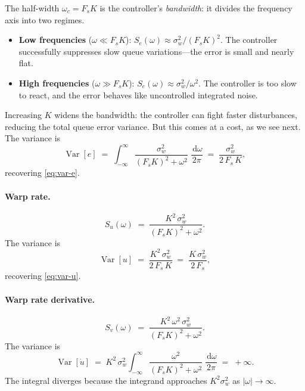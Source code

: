 \documentclass[11pt, a4paper]{article}
\theoremstyle{definition}
\theoremstyle{plain}
\theoremstyle{remark}
\newcommand{\Var}{\operatorname{Var}}
\newcommand{\dd}{\,\mathrm{d}}                   %
\begin{document}
The half-width $\omega_c = F_s K$ is the controller's
\emph{bandwidth}: it divides the frequency axis into two regimes.
\begin{itemize}
  \item \textbf{Low frequencies} ($\omega \ll F_s K$):
    $S_e(\omega) \approx \sigma_w^2 / (F_s K)^2$.  The controller
    successfully suppresses slow queue variations---the error is
    small and nearly flat.
  \item \textbf{High frequencies} ($\omega \gg F_s K$):
    $S_e(\omega) \approx \sigma_w^2 / \omega^2$.  The controller
    is too slow to react, and the error behaves like uncontrolled
    integrated noise.
\end{itemize}
Increasing $K$ widens the bandwidth: the controller can fight
faster disturbances, reducing the total queue error variance.
But this comes at a cost, as we see next.
The variance is
\begin{equation}\label{eq:var-e-psd}
  \Var[e] \;=\; \int_{-\infty}^{\infty}
    \frac{\sigma_w^2}{(F_s K)^2 + \omega^2}\;
    \frac{\dd\omega}{2\pi}
  \;=\; \frac{\sigma_w^2}{2\,F_s\,K},
\end{equation}
recovering \eqref{eq:var-e}.

\paragraph{Warp rate.}
\begin{equation}\label{eq:psd-u}
  S_u(\omega) \;=\; \frac{K^2\,\sigma_w^2}{(F_s K)^2 + \omega^2}.
\end{equation}
The variance is
\begin{equation}\label{eq:var-u-psd}
  \Var[u] \;=\; \frac{K^2\,\sigma_w^2}{2\,F_s\,K}
          \;=\; \frac{K\,\sigma_w^2}{2\,F_s},
\end{equation}
recovering \eqref{eq:var-u}.

\paragraph{Warp rate derivative.}
\begin{equation}\label{eq:psd-v}
  S_v(\omega) \;=\; \frac{K^2\,\omega^2\,\sigma_w^2}
    {(F_s K)^2 + \omega^2}.
\end{equation}
The variance is
\begin{equation}\label{eq:var-v-psd}
  \Var[\dot{u}] \;=\; K^2\,\sigma_w^2
    \int_{-\infty}^{\infty}
    \frac{\omega^2}{(F_s K)^2 + \omega^2}\;
    \frac{\dd\omega}{2\pi}
  \;=\; +\infty.
\end{equation}
The integral diverges because the integrand approaches
$K^2\sigma_w^2$ as $|\omega| \to \infty$.
\end{document}
